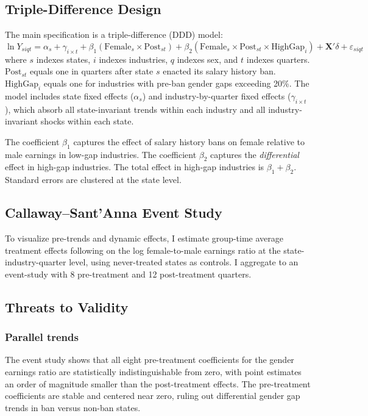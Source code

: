 \documentclass[12pt]{article}
\begin{document}
\subsection{Triple-Difference Design}

The main specification is a triple-difference (DDD) model:
\begin{equation}
\ln Y_{siqt} = \alpha_s + \gamma_{i \times t} + \beta_1 (\text{Female}_{s} \times \text{Post}_{st}) + \beta_2 (\text{Female}_{s} \times \text{Post}_{st} \times \text{HighGap}_{i}) + \mathbf{X}'\delta + \varepsilon_{siqt}
\label{eq:ddd}
\end{equation}
where $s$ indexes states, $i$ indexes industries, $q$ indexes sex, and $t$ indexes quarters. $\text{Post}_{st}$ equals one in quarters after state $s$ enacted its salary history ban. $\text{HighGap}_i$ equals one for industries with pre-ban gender gaps exceeding 20\%. The model includes state fixed effects ($\alpha_s$) and industry-by-quarter fixed effects ($\gamma_{i \times t}$), which absorb all state-invariant trends within each industry and all industry-invariant shocks within each state.

The coefficient $\beta_1$ captures the effect of salary history bans on female relative to male earnings in low-gap industries. The coefficient $\beta_2$ captures the \emph{differential} effect in high-gap industries. The total effect in high-gap industries is $\beta_1 + \beta_2$. Standard errors are clustered at the state level.

\subsection{Callaway--Sant'Anna Event Study}

To visualize pre-trends and dynamic effects, I estimate group-time average treatment effects following \citet{CallawayS2021} on the log female-to-male earnings ratio at the state-industry-quarter level, using never-treated states as controls. I aggregate to an event-study with 8 pre-treatment and 12 post-treatment quarters.

\subsection{Threats to Validity}

\subsubsection*{Parallel trends} The event study shows that all eight pre-treatment coefficients for the gender earnings ratio are statistically indistinguishable from zero, with point estimates an order of magnitude smaller than the post-treatment effects. The pre-treatment coefficients are stable and centered near zero, ruling out differential gender gap trends in ban versus non-ban states.
\end{document}
